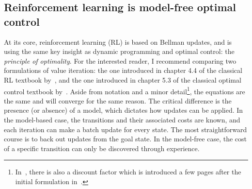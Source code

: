 
\subsection{Reinforcement learning is model-free optimal control}
At its core, reinforcement learning (RL) is based on Bellman updates, and is using the same key insight as dynamic programming and optimal control: the \emph{principle of optimality}.
For the interested reader, I recommend comparing two formulations of value iteration: the one introduced in chapter 4.4 of the classical RL textbook by~\textcite{sutton2018book}, and the one introduced in chapter 5.3 of the classical optimal control textbook by~\textcite{bertsekas2017book}. Aside from notation and a minor detail\footnote{In~\cite{sutton2018book}, there is also a discount factor which is introduced a few pages after the initial formulation in~\cite{bertsekas2017book}.}, the equations are the same and will converge for the same reason. The critical difference is the presence (or absence) of a model, which dictates how updates can be applied.
In the model-based case, the transitions and their associated costs are known, and each iteration can make a batch update for every state. The most straightforward course is to back out updates from the goal state. In the model-free case, the cost of a specific transition can only be discovered through experience. \par
